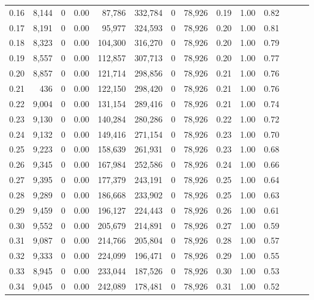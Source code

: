 \begin{tabular}{rrrrrrrrrrrrrr}
0.16 &  8,144 &      0 &  0.00 &   87,786 &  332,784 &       0 &  78,926 &  0.19 &  1.00 &      0.82 \\
0.17 &  8,191 &      0 &  0.00 &   95,977 &  324,593 &       0 &  78,926 &  0.20 &  1.00 &      0.81 \\
0.18 &  8,323 &      0 &  0.00 &  104,300 &  316,270 &       0 &  78,926 &  0.20 &  1.00 &      0.79 \\
0.19 &  8,557 &      0 &  0.00 &  112,857 &  307,713 &       0 &  78,926 &  0.20 &  1.00 &      0.77 \\
0.20 &  8,857 &      0 &  0.00 &  121,714 &  298,856 &       0 &  78,926 &  0.21 &  1.00 &      0.76 \\
0.21 &    436 &      0 &  0.00 &  122,150 &  298,420 &       0 &  78,926 &  0.21 &  1.00 &      0.76 \\
0.22 &  9,004 &      0 &  0.00 &  131,154 &  289,416 &       0 &  78,926 &  0.21 &  1.00 &      0.74 \\
0.23 &  9,130 &      0 &  0.00 &  140,284 &  280,286 &       0 &  78,926 &  0.22 &  1.00 &      0.72 \\
0.24 &  9,132 &      0 &  0.00 &  149,416 &  271,154 &       0 &  78,926 &  0.23 &  1.00 &      0.70 \\
0.25 &  9,223 &      0 &  0.00 &  158,639 &  261,931 &       0 &  78,926 &  0.23 &  1.00 &      0.68 \\
0.26 &  9,345 &      0 &  0.00 &  167,984 &  252,586 &       0 &  78,926 &  0.24 &  1.00 &      0.66 \\
0.27 &  9,395 &      0 &  0.00 &  177,379 &  243,191 &       0 &  78,926 &  0.25 &  1.00 &      0.64 \\
0.28 &  9,289 &      0 &  0.00 &  186,668 &  233,902 &       0 &  78,926 &  0.25 &  1.00 &      0.63 \\
0.29 &  9,459 &      0 &  0.00 &  196,127 &  224,443 &       0 &  78,926 &  0.26 &  1.00 &      0.61 \\
0.30 &  9,552 &      0 &  0.00 &  205,679 &  214,891 &       0 &  78,926 &  0.27 &  1.00 &      0.59 \\
0.31 &  9,087 &      0 &  0.00 &  214,766 &  205,804 &       0 &  78,926 &  0.28 &  1.00 &      0.57 \\
0.32 &  9,333 &      0 &  0.00 &  224,099 &  196,471 &       0 &  78,926 &  0.29 &  1.00 &      0.55 \\
0.33 &  8,945 &      0 &  0.00 &  233,044 &  187,526 &       0 &  78,926 &  0.30 &  1.00 &      0.53 \\
0.34 &  9,045 &      0 &  0.00 &  242,089 &  178,481 &       0 &  78,926 &  0.31 &  1.00 &      0.52 \\

\end{tabular}
